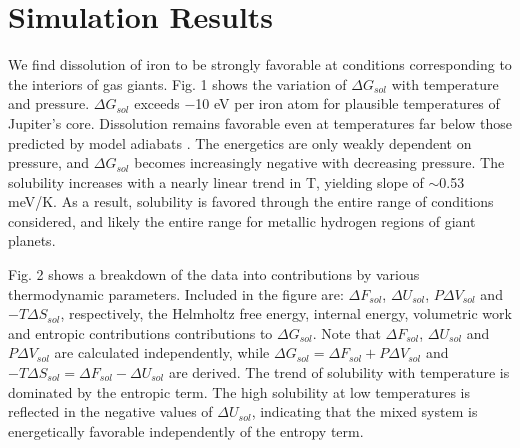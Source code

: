 \section{Simulation Results}

We find dissolution of iron to be strongly favorable at conditions corresponding to
the interiors of gas giants. Fig. 1 shows the variation of $\Delta G_{sol}$
with temperature and pressure. $\Delta G_{sol}$ exceeds $-$10 eV per iron atom for
plausible temperatures of Jupiter's core. Dissolution remains favorable even
at temperatures far below those predicted by model adiabats
\citep{militzer13,militzer13b}. The energetics
are only weakly dependent on pressure, and  $\Delta G_{sol}$ becomes increasingly
negative with decreasing pressure. The solubility increases with a nearly
linear trend in T, 
yielding slope of $\sim$0.53 meV/K. As a result, solubility is favored
through the entire range of conditions considered, and likely the entire range
for metallic hydrogen regions of giant planets.

Fig. 2 shows a breakdown of the data into contributions by various
thermodynamic parameters. Included in the figure are: $\Delta F_{sol}$, $\Delta U_{sol}$,
$P\Delta V_{sol}$ and $-T\Delta S_{sol}$, respectively, the Helmholtz free energy, internal
energy, volumetric work and entropic contributions contributions to $\Delta
G_{sol}$. Note that $\Delta F_{sol}$, $\Delta U_{sol}$ and $P\Delta V_{sol}$
are calculated independently, while $\Delta G_{sol}=\Delta F_{sol}+P\Delta
V_{sol}$ and $-T\Delta S_{sol}=\Delta F_{sol}-\Delta U_{sol}$ are derived. 
The trend of solubility with temperature is dominated by the entropic term.
The high solubility at low temperatures is
reflected in the negative values of $\Delta U_{sol}$, indicating that the
mixed system is energetically favorable independently of the entropy term. 

